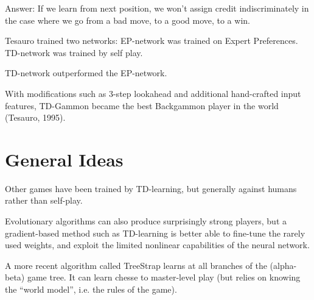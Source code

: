 Answer: If we learn from next position, we won't assign credit indiscriminately
in the case where we go from a bad move, to a good move, to a win.

Tesauro trained two networks: EP-network was trained on Expert Preferences.
TD-network was trained by self play.

TD-network outperformed the EP-network.

With modifications such as 3-step lookahead and additional hand-crafted input
features, TD-Gammon became the best Backgammon player in the world (Tesauro,
1995).

\section{General Ideas}
Other games have been trained by TD-learning, but generally against humans
rather than self-play.

Evolutionary algorithms can also produce surprisingly strong players, but a
gradient-based method such as TD-learning is better able to fine-tune the
rarely used weights, and exploit the limited nonlinear capabilities of the
neural network.

A more recent algorithm called TreeStrap learns at all branches of the
(alpha-beta) game tree. It can learn chesse to master-level play (but relies on
knowing the ``world model'', i.e. the rules of the game).
